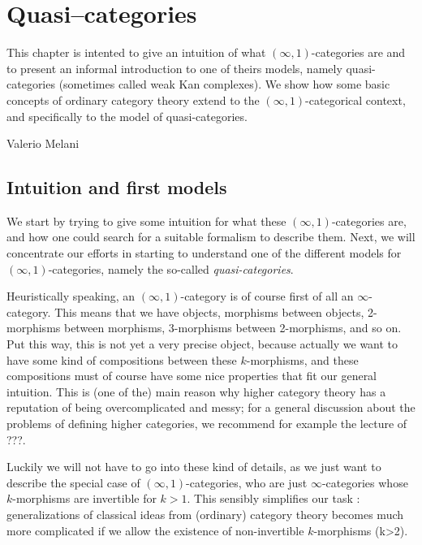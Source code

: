 \chapter{Quasi--categories}

\begin{refsection}

This chapter is intented to give an intuition of what $(\infty,1)$-categories are and to present an informal introduction to one of theirs models, namely quasi-categories (sometimes called weak Kan complexes). We show how some basic concepts of ordinary category theory extend to the $(\infty,1)$-categorical context, and specifically to the model of quasi-categories.

\begin{flushright}
Valerio Melani
\end{flushright}

\section{Intuition and first models}

We start by trying to give some intuition for what these $(\infty,1)$-categories are, and how one could search for a suitable formalism to describe them. Next, we will concentrate our efforts in starting to understand one of the different models for $(\infty,1)$-categories, namely the so-called \emph{quasi-categories}.

Heuristically speaking, an $(\infty,1)$-category is of course first of all an $\infty$-category. This means that we have objects, morphisms between objects, 2-morphisms between morphisms, 3-morphisms between 2-morphisms, and so on. Put this way, this is not yet a very precise object, because actually we want to have some kind of compositions between these $k$-morphisms, and these compositions must of course have some nice properties that fit our general intuition. This is (one of the) main reason why higher category theory has a reputation of being overcomplicated and messy; for a general discussion about the problems of defining higher categories, we recommend for example the lecture of ???.

Luckily we will not have to go into these kind of details, as we just want to describe the special case of $(\infty,1)$-categories, who are just $\infty$-categories whose $k$-morphisms are invertible for $k>1$. This sensibly simplifies our task : generalizations of classical ideas from (ordinary) category theory becomes much more complicated if we allow the existence of non-invertible $k$-morphisms (k>2).


\end{refsection}
